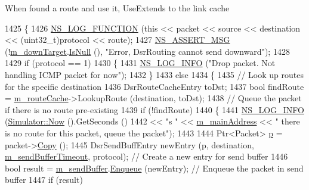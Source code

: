 When found a route and use it, Use\+Extends to the link cache 
\begin{DoxyCode}
1425 \{
1426   \hyperlink{log-macros-disabled_8h_a90b90d5bad1f39cb1b64923ea94c0761}{NS\_LOG\_FUNCTION} (\textcolor{keyword}{this} << packet << source << destination << (uint32\_t)protocol << route);
1427   \hyperlink{assert_8h_aff5ece9066c74e681e74999856f08539}{NS\_ASSERT\_MSG} (!\hyperlink{classns3_1_1dsr_1_1DsrRouting_aa1eb6ea60fdf9ba2cac2079a74ce1ca4}{m\_downTarget}.\hyperlink{classns3_1_1Callback_aa8e27826badbf37f84763f36f70d9b54}{IsNull} (), \textcolor{stringliteral}{"Error, DsrRouting cannot send
       downward"});
1428 
1429   \textcolor{keywordflow}{if} (protocol == 1)
1430     \{
1431       \hyperlink{group__logging_gafbd73ee2cf9f26b319f49086d8e860fb}{NS\_LOG\_INFO} (\textcolor{stringliteral}{"Drop packet. Not handling ICMP packet for now"});
1432     \}
1433   \textcolor{keywordflow}{else}
1434     \{
1435       \textcolor{comment}{// Look up routes for the specific destination}
1436       DsrRouteCacheEntry toDst;
1437       \textcolor{keywordtype}{bool} findRoute = \hyperlink{classns3_1_1dsr_1_1DsrRouting_ac409bdb961b9fff0fb63ebd026be99ad}{m\_routeCache}->LookupRoute (destination, toDst);
1438       \textcolor{comment}{// Queue the packet if there is no route pre-existing}
1439       \textcolor{keywordflow}{if} (!findRoute)
1440         \{
1441           \hyperlink{group__logging_gafbd73ee2cf9f26b319f49086d8e860fb}{NS\_LOG\_INFO} (\hyperlink{classns3_1_1Simulator_ac3178fa975b419f7875e7105be122800}{Simulator::Now} ().GetSeconds ()
1442                        << \textcolor{stringliteral}{"s "} << \hyperlink{classns3_1_1dsr_1_1DsrRouting_a73182b5edee2d8460f28855e058fc9a0}{m\_mainAddress} << \textcolor{stringliteral}{" there is no route for this packet, queue
       the packet"});
1443 
1444           Ptr<Packet> \hyperlink{lte__link__budget_8m_ac9de518908a968428863f829398a4e62}{p} = packet->\hyperlink{classns3_1_1Packet_a5d5c70802a5f77fc5f0001e0cfc1898b}{Copy} ();
1445           DsrSendBuffEntry newEntry (p, destination, \hyperlink{classns3_1_1dsr_1_1DsrRouting_a1f89794801db0336d92e4ca85fbc09a7}{m\_sendBufferTimeout}, protocol);    
       \textcolor{comment}{// Create a new entry for send buffer}
1446           \textcolor{keywordtype}{bool} result = \hyperlink{classns3_1_1dsr_1_1DsrRouting_a887ae39d7060171753c0605d5c120549}{m\_sendBuffer}.\hyperlink{classns3_1_1dsr_1_1DsrSendBuffer_aac846f6a38f6fc6431c8483103ed5121}{Enqueue} (newEntry);     \textcolor{comment}{// Enqueue the packet in
       send buffer}
1447           \textcolor{keywordflow}{if} (result)

\end{DoxyCode}

